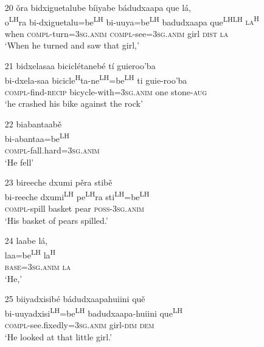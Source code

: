 \begin{itemize}
\item[20]
\glll \v{o}ra bidxiguetalube b\'{i}iyabe b\'{a}dudxaapa que l\'{a},\\
o\textsuperscript{LH}ra bi-dxiguetalu=be\textsuperscript{LH} bi-uuya=be\textsuperscript{LH} badudxaapa que\textsuperscript{LH}\textsuperscript{LH} \textsc{la\textsuperscript{H}}\\
when \textsc{compl}-turn=3\textsc{sg.anim} \textsc{compl}-see=3\textsc{sg.anim} girl \textsc{dist} \textsc{la}\\
\glt `When he turned and saw that girl,'


\item[21]
\glll bidxelasaa bicicl\'{e}taneb\'{e} t\'{i} guieroo'ba\\
bi-dxela-saa bicicle\textsuperscript{H}ta-ne\textsuperscript{LH}=be\textsuperscript{LH} ti guie-roo'ba\\
\textsc{compl}-find-\textsc{recip} bicycle-with=3\textsc{sg.anim} one stone-\textsc{aug}\\
\glt `he crashed his bike against the rock' 


\item[22]
\glll biabantaab\v{e}\\
bi-abantaa=be\textsuperscript{LH}\\
\textsc{compl}-fall.hard=3\textsc{sg.anim}\\
\glt `He fell'


\item[23]
\glll bireeche dxumi p\v{e}ra stib\v{e}\\
bi-reeche dxumi\textsuperscript{LH} pe\textsuperscript{LH}ra sti\textsuperscript{LH}=be\textsuperscript{LH}\\
\textsc{compl}-spill basket pear \textsc{poss}-3\textsc{sg.anim}\\
\glt `His basket of pears spilled.'


\item[24]
\glll laabe l\'{a},\\
laa=be\textsuperscript{LH} la\textsuperscript{H}\\
\textsc{base}=3\textsc{sg.anim} \textsc{la}\\
\glt `He,'


\item[25]
\glll biiyadxisib\'{e} b\'{a}dudxaapahuiini qu\v{e}\\
bi-uuyadxisi\textsuperscript{LH}=be\textsuperscript{LH} badudxaapa-huiini que\textsuperscript{LH}\\
\textsc{compl}-see.fixedly=3\textsc{sg.anim} girl-\textsc{dim} \textsc{dem}\\
\glt `He looked at that little girl.' 



\end{itemize}
